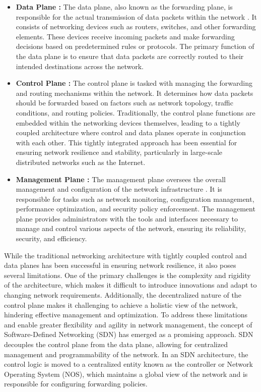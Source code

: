 \begin{itemize}
\item  \textbf{Data Plane :} The data plane, also known as the forwarding plane, is responsible for the actual transmission of data packets within the network \cite{tr2016sdn}. It consists of networking devices such as routers, switches, and other forwarding elements. These devices receive incoming packets and make forwarding decisions based on predetermined rules or protocols. The primary function of the data plane is to ensure that data packets are correctly routed to their intended destinations across the network.
\item  \textbf{Control Plane :} The control plane is tasked with managing the forwarding and routing mechanisms within the network\cite{tr2016sdn}. It determines how data packets should be forwarded based on factors such as network topology, traffic conditions, and routing policies. Traditionally, the control plane functions are embedded within the networking devices themselves, leading to a tightly coupled architecture where control and data planes operate in conjunction with each other. This tightly integrated approach has been essential for ensuring network resilience and stability, particularly in large-scale distributed networks such as the Internet.
\item \textbf{Management Plane :} The management plane oversees the overall management and configuration of the network infrastructure \cite{tr2016sdn}. It is responsible for tasks such as network monitoring, configuration management, performance optimization, and security policy enforcement. The management plane provides administrators with the tools and interfaces necessary to manage and control various aspects of the network, ensuring its reliability, security, and efficiency.
\end{itemize}

While the traditional networking architecture with tightly coupled control and data planes has been successful in ensuring network resilience, it also poses several limitations. One of the primary challenges is the complexity and rigidity of the architecture, which makes it difficult to introduce innovations and adapt to changing network requirements. Additionally, the decentralized nature of the control plane makes it challenging to achieve a holistic view of the network, hindering effective management and optimization.
To address these limitations and enable greater flexibility and agility in network management, the concept of Software-Defined Networking (SDN) has emerged as a promising approach. SDN decouples the control plane from the data plane, allowing for centralized management and programmability of the network. In an SDN architecture, the control logic is moved to a centralized entity known as the controller or Network Operating System (NOS), which maintains a global view of the network and is responsible for configuring forwarding policies.

